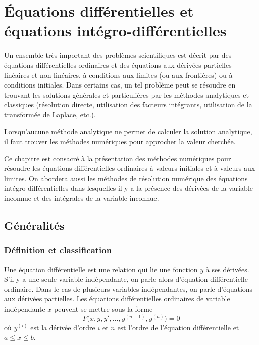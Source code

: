 \chapter{Équations différentielles et équations intégro-différentielles}

Un ensemble très important des problèmes scientifiques est décrit par des
équations différentielles ordinaires et des équations aux dérivées partielles
linéaires et non linéaires, à conditions aux limites (ou aux frontières) ou à
conditions initiales. Dans certains cas, un tel problème peut se résoudre en
trouvant les solutions générales et particulières par les méthodes analytiques
et classiques (résolution directe, utilisation des facteurs intégrants,
utilisation de la transformée de Laplace, etc.).

Lorsqu'aucune méthode analytique ne permet de calculer la solution analytique,
il faut trouver les méthodes numériques pour approcher la valeur cherchée.

Ce chapitre est consacré à la présentation des méthodes numériques pour
résoudre les équations différentielles ordinaires à valeurs initiales et à
valeurs aux limites. On abordera aussi les méthodes de résolution numérique
des équations intégro-différentielles dans lesquelles il y a la présence des
dérivées de la variable inconnue et des intégrales de la variable inconnue.

\section{Généralités}

\subsection{Définition et classification}

Une équation différentielle est une relation qui lie une fonction $y$ à ses
dérivées. S'il y a une seule variable indépendante, on parle alors d'équation
différentielle ordinaire. Dans le cas de plusieurs variables indépendantes, on
parle d'équations aux dérivées partielles. Les équations différentielles
ordinaires de variable indépendante $x$ peuvent se mettre sous la forme
\begin{equation}
  F\bigl(x, y, y', \dots, y^{(n-1)}, y^{(n)}\bigr) = 0
  \tag{1}
\end{equation}
où $y^{(i)}$ est la dérivée d'ordre $i$ et $n$ est l'ordre de l'équation
différentielle et $a \le x \le b$.

